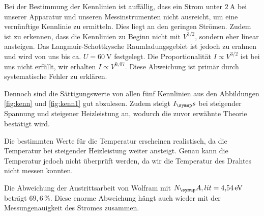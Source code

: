 Bei der Bestimmung der Kennlinien ist auffällig, dass ein Strom unter $\SI{2}{\ampere}$
bei unserer Apparatur und unseren Messinstrumenten nicht ausreicht, um eine vernünftige
Kennlinie zu ermitteln. Dies liegt an den geringen Strömen. Zudem ist zu erkennen, dass
die Kennlinien zu Beginn nicht mit $V^{3/2}$, sondern eher linear ansteigen. Das Langmuir-Schottkysche
Raumladungsgebiet ist jedoch zu erahnen und wird von uns bis ca. $U = \SI{60}{\volt}$
festgelegt. Die Proportionalität $I \propto V^{3/2}$ ist bei uns nicht erfüllt,
wir erhalten $I \propto V^{0,07}$. Diese Abweichung ist primär durch systematische Fehler
zu erklären.

Dennoch
sind die Sättigungswerte von allen fünf Kennlinien aus den Abbildungen
\ref{fig:kenn} und \ref{fig:kenn1} gut abzulesen. Zudem steigt
$I_\su{s}$ bei steigender Spannung und steigener Heizleistung an, wodurch die
zuvor erwähnte Theorie bestätigt wird.

Die bestimmten Werte für die Temperatur erscheinen realistisch, da die Temperatur bei
steigender Heizleistung weiter ansteigt. Genau kann die Temperatur jedoch nicht überprüft
werden, da wir die Temperatur des Drahtes nicht messen konnten.

Die Abweichung der Austrittsarbeit von Wolfram mit $N_\su{A,lit} = \SI{4,54}{\electronvolt}$
\cite{na} beträgt $69,6\,\%$. Diese enorme Abweichung hängt auch wieder mit der Messungenauigkeit des
Stromes zusammen.
